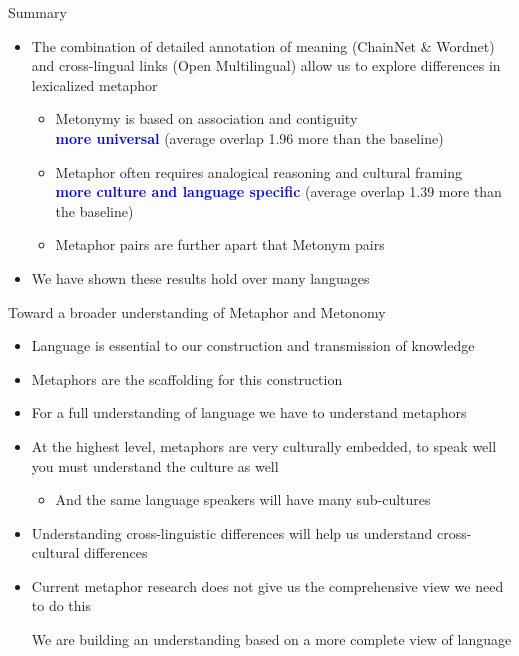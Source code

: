 \documentclass[xetex]{beamer}  %
\newcommand{\txx}[1]{\textbf{\textcolor{blue}{#1}}}
\begin{document}
\begin{frame}{Summary}
  
\begin{itemize}
\item The combination of detailed annotation of meaning (ChainNet \& Wordnet) and
  cross-lingual links (Open Multilingual) allow us to explore differences in lexicalized metaphor
  \begin{itemize}
  \item  Metonymy is based on association and contiguity
    \\ \txx{more universal} (average overlap 1.96 more than the baseline)
  \item  Metaphor often requires analogical reasoning and cultural framing
    \\ \txx{more culture and language specific} (average overlap 1.39 more than the baseline)
  \item Metaphor pairs are further apart that Metonym pairs
  \end{itemize}
\item We have shown these results hold over many languages

\end{itemize}

\end{frame}

\begin{frame}{Toward a broader understanding of Metaphor and Metonomy}
  \begin{itemize}
  \item Language is essential to our construction and transmission of knowledge
  \item Metaphors are the scaffolding for this construction
  \item For a full understanding of language we have to understand metaphors
  \item At the highest level, metaphors are very culturally embedded, to speak well you must understand the culture as well
    \begin{itemize}
    \item And the same language speakers will have many sub-cultures
    \end{itemize}
  \item Understanding cross-linguistic differences will help us understand cross-cultural differences
  \item Current metaphor research does not give us the comprehensive view we need to do this
    \begin{center}
      \large We are building an understanding based on a more complete view of language
    \end{center}
  \end{itemize}
\end{frame}
\end{document}
